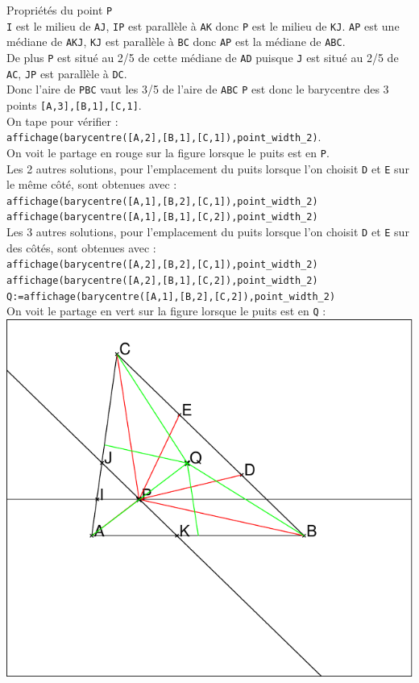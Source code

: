 \documentclass[a4paper,11pt]{book}
\begin{document}
Propri\'et\'es du point {\tt P}\\
{\tt I} est le milieu de {\tt AJ}, {\tt IP} est parall\`ele \`a {\tt AK} 
donc {\tt P} est le milieu de {\tt KJ}.
{\tt AP} est une m\'ediane de {\tt AKJ}, {\tt KJ} est parall\`ele \`a {\tt BC}
donc {\tt AP} est la  m\'ediane de {\tt ABC}.\\
De plus {\tt P} est situ\'e au 2/5 de cette m\'ediane de {\tt AD} puisque 
{\tt J} est situ\'e au 2/5 de {\tt AC}, {\tt JP} est parall\`ele \`a {\tt DC}.\\
Donc l'aire de {\tt PBC} vaut les 3/5 de l'aire de {\tt ABC}
{\tt P} est donc le barycentre des 3 points {\tt [A,3],[B,1],[C,1]}.\\
On tape pour v\'erifier :\\
{\tt affichage(barycentre([A,2],[B,1],[C,1]),point\_width\_2)}.\\
On voit le partage en rouge sur la figure lorsque le puits est en {\tt P}.\\
Les 2 autres solutions, pour l'emplacement du puits lorsque l'on choisit 
{\tt D} et {\tt E} sur le m\^eme c\^ot\'e, sont obtenues avec :\\
{\tt affichage(barycentre([A,1],[B,2],[C,1]),point\_width\_2)}\\
{\tt affichage(barycentre([A,1],[B,1],[C,2]),point\_width\_2)}\\
Les 3 autres solutions, pour l'emplacement du puits lorsque l'on choisit 
{\tt D} et {\tt E} sur des c\^ot\'es, sont obtenues avec :\\
{\tt affichage(barycentre([A,2],[B,2],[C,1]),point\_width\_2)}\\
{\tt affichage(barycentre([A,2],[B,1],[C,2]),point\_width\_2)}\\
{\tt Q:=affichage(barycentre([A,1],[B,2],[C,2]),point\_width\_2)}\\ 
On voit le partage en vert sur la figure lorsque le puits est en {\tt Q} :\\

\includegraphics[width=\textwidth]{triangles5}
\end{document}
